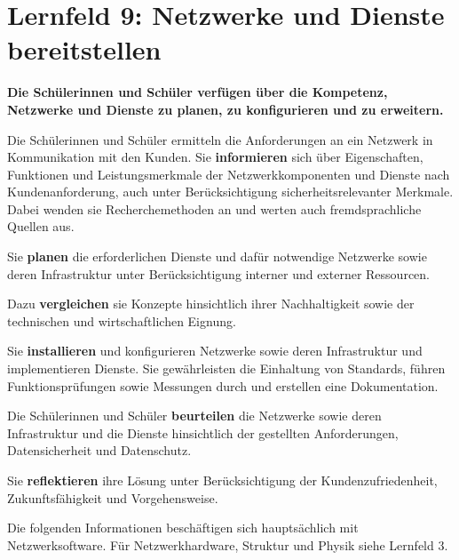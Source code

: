 \chapter{Lernfeld 9: Netzwerke und Dienste bereitstellen}

\textbf{Die Schülerinnen und Schüler verfügen über die Kompetenz, Netzwerke und Dienste
    zu planen, zu konfigurieren und zu erweitern.}

Die Schülerinnen und Schüler ermitteln die Anforderungen an ein Netzwerk in Kommunikation mit den Kunden. Sie \textbf{informieren} sich über Eigenschaften, Funktionen und Leistungsmerkmale der Netzwerkkomponenten und Dienste nach Kundenanforderung, auch unter
Berücksichtigung sicherheitsrelevanter Merkmale. Dabei wenden sie Recherchemethoden
an und werten auch fremdsprachliche Quellen aus.

Sie \textbf{planen} die erforderlichen Dienste und dafür notwendige Netzwerke sowie deren Infrastruktur unter Berücksichtigung interner und externer Ressourcen.

Dazu \textbf{vergleichen} sie Konzepte hinsichtlich ihrer Nachhaltigkeit sowie der technischen und
wirtschaftlichen Eignung.

Sie \textbf{installieren} und konfigurieren Netzwerke sowie deren Infrastruktur und implementieren
Dienste. Sie gewährleisten die Einhaltung von Standards, führen Funktionsprüfungen sowie
Messungen durch und erstellen eine Dokumentation.

Die Schülerinnen und Schüler \textbf{beurteilen} die Netzwerke sowie deren Infrastruktur und die
Dienste hinsichtlich der gestellten Anforderungen, Datensicherheit und Datenschutz.

Sie \textbf{reflektieren} ihre Lösung unter Berücksichtigung der Kundenzufriedenheit, Zukunftsfähigkeit und Vorgehensweise.

Die folgenden Informationen beschäftigen sich hauptsächlich mit Netzwerksoftware. Für Netzwerkhardware, Struktur und Physik siehe Lernfeld 3.




